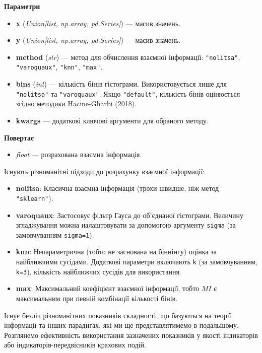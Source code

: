 \documentclass[
  letterpaper,
]{report}
\providecommand{\tightlist}{%
  \setlength{\itemsep}{0pt}\setlength{\parskip}{0pt}}\usepackage{longtable,booktabs,array}
\begin{document}
\textbf{Параметри}

\begin{itemize}
\tightlist
\item
  \textbf{x} (\emph{Union{[}list, np.array, pd.Series{]}}) --- масив
  значень.
\item
  \textbf{y} (\emph{Union{[}list, np.array, pd.Series{]}}) --- масив
  значень.
\item
  \textbf{method} (\emph{str}) --- метод для обчислення взаємної
  інформації: \texttt{"nolitsa"}, \texttt{"varoquaux"}, \texttt{"knn"},
  \texttt{"max"}.
\item
  \textbf{bins} (\emph{int}) --- кількість бінів гістограми.
  Використовується лише для \texttt{"nolitsa"} та \texttt{"varoquaux"}.
  Якщо \texttt{"default"}, кількість бінів оцінюється згідно методики
  Hacine-Gharbi (2018).
\item
  \textbf{kwargs} --- додаткові ключові аргументи для обраного методу.
\end{itemize}

\textbf{Повертає}

\begin{itemize}
\tightlist
\item
  \emph{float} --- розрахована взаємна інформація.
\end{itemize}

Існують різноманітні підходи до розрахунку взаємної інформації:

\begin{itemize}
\tightlist
\item
  \textbf{nolitsa}: Класична взаємна інформація (трохи швидше, ніж метод
  \texttt{"sklearn"}).
\item
  \textbf{varoquaux}: Застосовує фільтр Гауса до об'єднаної гістограми.
  Величину згладжування можна налаштовувати за допомогою аргументу
  \texttt{sigma} (за замовчуванням \texttt{sigma=1}).
\item
  \textbf{knn}: Непараметрична (тобто не заснована на біннінгу) оцінка
  за найближчими сусідами. Додаткові параметри включають \texttt{k} (за
  замовчуванням, \texttt{k=3}), кількість найближчих сусідів для
  використання.
\item
  \textbf{max}: Максимальний коефіцієнт взаємної інформації, тобто
  \(MI\) є максимальним при певній комбінації кількості бінів.
\end{itemize}

Існує безліч різноманітних показників складності, що базуються на теорії
інформації та інших парадигах, які ми ще представлятимемо в подальшому.
Розглянемо ефективність використання зазначених показників у якості
індикаторів або індикаторів-передвісників крахових подій.
\end{document}
